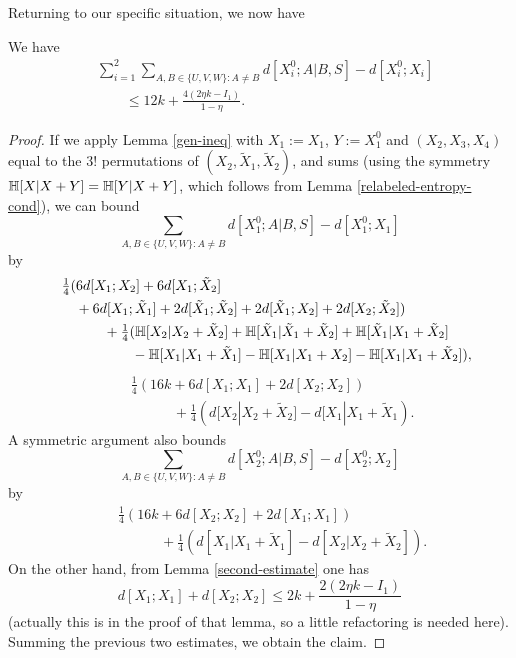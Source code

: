 Returning to our specific situation, we now have

\begin{lemma}\label{dist-diff-bound}\label{dist_diff_bound} We have
\begin{align*}  &\sum_{i=1}^2 \sum_{A,B \in \{U,V,W\}: A \neq B}  d[X_i^0;A|B, S] - d[X_i^0;X_i]\\
&\qquad \leq 12 k + \frac{4(2 \eta k - I_1)}{1-\eta}.
\end{align*}
\end{lemma}

\begin{proof}  If we apply Lemma \ref{gen-ineq} with $X_1:=X_1$, $Y:=X_1^0$ and $(X_2,X_3,X_4)$ equal to the $3!$ permutations of $(X_2,\tilde X_1,\tilde X_2)$, and sums (using the symmetry $\mathbb{H}[X|X+Y] = \mathbb{H}[Y|X+Y]$, which follows from Lemma \ref{relabeled-entropy-cond}), we can bound
$$ \sum_{A,B \in \{U,V,W\}: A \neq B}  d[X_1^0;A|B, S] - d[X_1^0;X_1]$$
by
\begin{align*}
  &\quad \tfrac{1}{4} (6d[X_1;X_2] + 6d[X_1;\tilde X_2]\\
  &\qquad + 6d[X_1;\tilde X_1] + 2d[\tilde X_1;\tilde X_2] + 2 d[\tilde X_1;X_2] + 2d[X_2;\tilde X_2])\\
  &\qquad \qquad + \tfrac{1}{4} (\mathbb{H}[X_2|X_2+\tilde X_2] + \mathbb{H}[\tilde X_1|\tilde X_1+\tilde X_2] + \mathbb{H}[\tilde X_1|X_1+\tilde X_2] \\
  &\qquad \qquad \qquad - \mathbb{H}[X_1|X_1+\tilde X_1] - \mathbb{H}[X_1|X_1+X_2] - \mathbb{H}[X_1|X_1+\tilde X_2]),
\end{align*}
\begin{align*}
  &\quad \tfrac{1}{4} (16k + 6d[X_1;X_1] + 2d[X_2;X_2])\\
  &\qquad \qquad + \tfrac{1}{4} (d[X_2|X_2+\tilde X_2] - d[X_1|X_1+\tilde X_1).
\end{align*}
A symmetric argument also bounds
$$ \sum_{A,B \in \{U,V,W\}: A \neq B}  d[X_2^0;A|B, S] - d[X_2^0;X_2]$$
by
\begin{align*}
  &\quad \tfrac{1}{4} (16k + 6d[X_2;X_2] + 2d[X_1;X_1])\\
  &\qquad \qquad + \tfrac{1}{4} (d[X_1|X_1+\tilde X_1] - d[X_2|X_2+\tilde X_2]).
\end{align*}
On the other hand, from Lemma \ref{second-estimate} one has
$$ d[X_1;X_1] + d[X_2;X_2] \leq 2 k + \frac{2(2 \eta k - I_1)}{1-\eta}$$
(actually this is in the proof of that lemma, so a little refactoring is needed here).  Summing the previous two estimates, we obtain the claim.
\end{proof}


